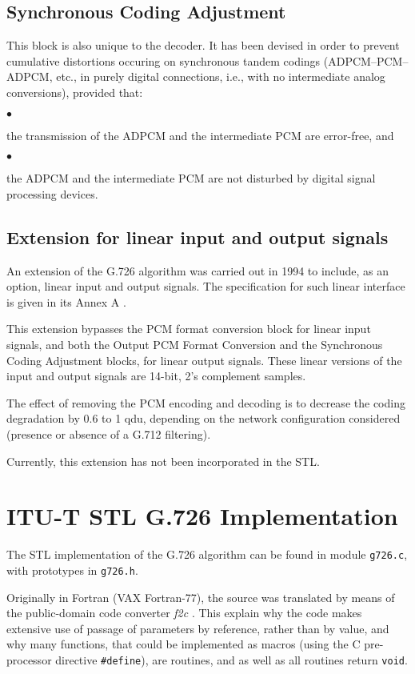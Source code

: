 \subsection{Synchronous Coding Adjustment}

This block is also unique to the decoder. It has been devised in order
to prevent cumulative distortions occuring on synchronous tandem
codings (ADPCM--\-PCM--\-ADPCM, etc., in purely digital connections, i.e.,
with no intermediate analog conversions), provided that:

 $\bullet$ \parbox[t]{140mm}{
               the transmission of the ADPCM and the intermediate PCM are
               error-free, and }

 $\bullet$ \parbox[t]{140mm}{
               the ADPCM and the intermediate PCM are not disturbed by digital
               signal processing devices.}

\subsection{Extension for linear input and output signals}

An extension of the G.726 algorithm was carried out in 1994 to include, as
an option, linear input and output signals. The specification for such linear
interface is given in its Annex A \cite{G.726:LinearIO}.

This extension bypasses the PCM format conversion block for linear input
signals, and both the Output PCM Format Conversion and the Synchronous
Coding Adjustment blocks, for linear output signals. These linear versions
of the input and output signals are 14-bit, 2's complement samples.

The effect of removing the PCM encoding and decoding is to decrease the
coding degradation by 0.6 to 1 qdu, depending on the network configuration
considered (presence or absence of a G.712 filtering).

Currently, this extension has not been incorporated in the STL.


\section{ITU-T STL G.726 Implementation}

The STL implementation of the G.726 algorithm can be found
in module {\tt g726.c}, with prototypes in {\tt g726.h}.

Originally in Fortran (VAX Fortran-77), the source was translated by means
of the public-domain code converter {\em f2c} \cite{f2c}. This explain why
the code makes extensive use of passage of parameters by reference, rather
than by value, and why many functions, that could be implemented as macros
(using the C pre-processor directive {\tt \#define}), are routines, and as
well as all routines return {\tt void}.

